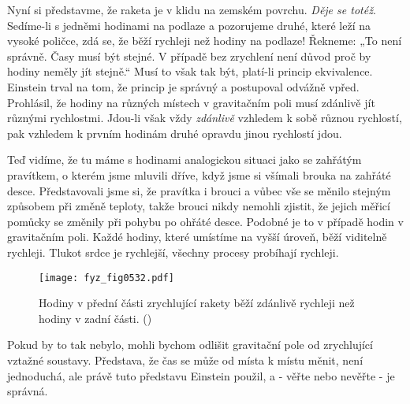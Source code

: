     Nyní si představme, že raketa je v klidu na zemském povrchu. \emph{Děje se totéž}. Sedíme-li s 
    jedněmi hodinami na podlaze a pozorujeme druhé, které leží na vysoké poličce, zdá se, že běží 
    rychleji než hodiny na podlaze! Řekneme: „To není správně. Časy musí být stejné. V případě bez 
    zrychlení není důvod proč by hodiny neměly jít stejně.“ Musí to však tak být, platí-li princip 
    ekvivalence. Einstein trval na tom, že princip je správný a postupoval odvážně vpřed. 
    Prohlásil, že hodiny na různých místech v gravitačním poli musí zdánlivě jít různými 
    rychlostmi. Jdou-li však vždy \emph{zdánlivě} vzhledem k sobě různou rychlostí, pak vzhledem k 
    prvním hodinám druhé opravdu jinou rychlostí jdou.
    
    Teď vidíme, že tu máme s hodinami analogickou situaci jako se zahřátým pravítkem, o kterém jsme 
    mluvili dříve, když jsme si všímali brouka na zahřáté desce. Představovali jsme si, že pravítka 
    i brouci a vůbec vše se měnilo stejným způsobem při změně teploty, takže brouci nikdy nemohli 
    zjistit, že jejich měřicí pomůcky se změnily při pohybu po ohřáté desce. Podobné je to v 
    případě hodin v gravitačním poli. Každé hodiny, které umístíme na vyšší úroveň, běží viditelně 
    rychleji. Tlukot srdce je rychlejší, všechny procesy probíhají rychleji.

    \begin{figure}[ht!] %
      \centering
      \texttt{[image: fyz\_fig0532.pdf]}
      \caption{Hodiny v přední části zrychlující rakety běží zdánlivě rychleji než hodiny v zadní 
               části. (\cite[s.~787]{Feynman02})}
      \label{fyz:fig0532}
    \end{figure}
    
    Pokud by to tak nebylo, mohli bychom odlišit gravitační pole od zrychlující vztažné soustavy. 
    Představa, že čas se může od místa k místu měnit, není jednoduchá, ale právě tuto představu 
    Einstein použil, a - věřte nebo nevěřte - je správná.
    

